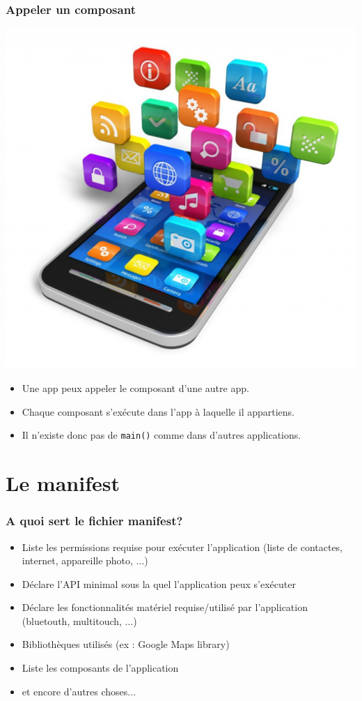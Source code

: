 \documentclass{beamer}
\begin{document}
\begin{frame}
\frametitle{Appeler un composant}
\begin{center}
\includegraphics[scale=0.1]{app.jpg}
\end{center}

\begin{itemize}
\item Une app peux appeler le composant d'une autre app.
\item Chaque composant s'exécute dans l'app à laquelle il appartiens.
\item Il n'existe donc pas de \verb!main()! comme dans d'autres applications.
\end{itemize}

\end{frame}

\section{Le manifest}

\begin{frame}
\frametitle{A quoi sert le fichier manifest?}

\begin{itemize}
\item Liste les permissions requise pour exécuter l'application (liste de contactes, internet, appareille photo, ...)
\item Déclare l'API minimal sous la quel l'application peux s'exécuter
\item Déclare les fonctionnalités matériel requise/utilisé par l'application (bluetouth, multitouch, ...)
\item Bibliothèques utilisés (ex : Google Maps library)
\item Liste les composants de l'application
\item et encore d'autres choses...
\end{itemize}

\end{frame}
\end{document}
